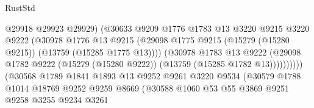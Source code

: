 \begin{lexlean}{RustStd}
\begin{coremodule}
                                          @29918
                                          @29923
                                          @29929)
                                        (@30633
                                          @9209
                                          @1776
                                          @1783
                                          @13
                                          @3220
                                          @9215
                                          @3220
                                          @9222
                                          (@30978
                                            @1776
                                            @13
                                            @9215
                                            (@29098
                                              @1775
                                              @9215
                                              (@15279 (@15280 @9215))
                                              (@13759 (@15285 @1775 @13))))
                                          (@30978
                                            @1783
                                            @13
                                            @9222
                                            (@29098
                                              @1782
                                              @9222
                                              (@15279 (@15280 @9222))
                                              (@13759 (@15285 @1782 @13))))))))))
                              (@30568
                                @1789
                                @1841
                                @1893
                                @13
                                @9252
                                @9261
                                @3220
                                @9534
                                (@30579
                                  @1788
                                  @1014
                                  @18769
                                  @9252
                                  @9259
                                  @8669
                                  (@30588
                                    @1060
                                    @53
                                    @55
                                    @3869
                                    @9251
                                    @9258
                                    @3255
                                    @9234
                                    @3261

\end{coremodule}
\end{lexlean}
